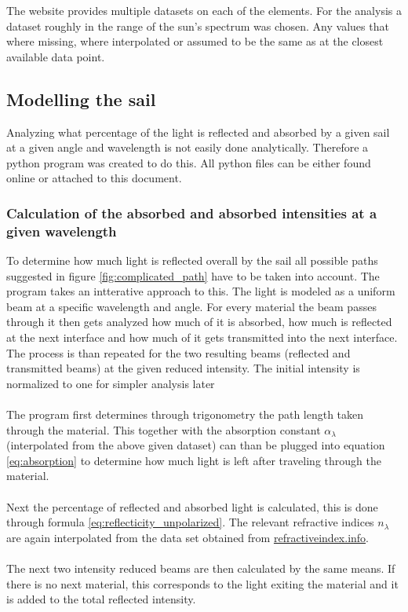 \documentclass[14pt]{article}
\begin{document}
The website provides multiple datasets on each of the elements. For the analysis
a dataset roughly in the range of the sun's spectrum was chosen. Any values that
where missing, where interpolated or assumed to be the same as at the closest
available data point.

\subsection{Modelling the sail}

Analyzing what percentage of the light is reflected and absorbed by a given sail at a given angle and wavelength
is not easily done analytically. Therefore a python program was created to do this. All python files can be either found
online or attached to this document.

\subsubsection{Calculation of the absorbed and absorbed intensities at a given wavelength}
To determine how much light is reflected overall by the sail all possible paths suggested in figure \ref{fig:complicated_path}
have to be taken into account. The program takes an intterative approach to this. The light is modeled as a uniform beam at a
specific wavelength and angle. For every material the beam passes through it then gets analyzed how much of it is absorbed, how much
is reflected at the next interface and how much of it gets transmitted into the next interface. The process is than repeated
for the two resulting beams (reflected and transmitted beams) at the given reduced intensity. The initial intensity is normalized
to one for simpler analysis later\\
\\
The program first determines through trigonometry the path length taken through the material. This together
with the absorption constant $\alpha_{\lambda}$ (interpolated from the above given dataset) can than be plugged into
equation \ref{eq:absorption} to determine how much light is left after traveling through the material.\\
\\
Next the percentage of reflected and absorbed light is calculated, this is done through formula \ref{eq:reflecticity_unpolarized}.
The relevant refractive indices $n_{\lambda}$ are again interpolated from the data set obtained from \hyperref{https://refractiveindex.info}{}{}{refractiveindex.info}\autocite{polyanskiy}.\\
\\
The next two intensity reduced beams are then calculated by the same means. If there is no next material, this
corresponds to the light exiting the material and it is added to the total reflected intensity.\\
\end{document}
